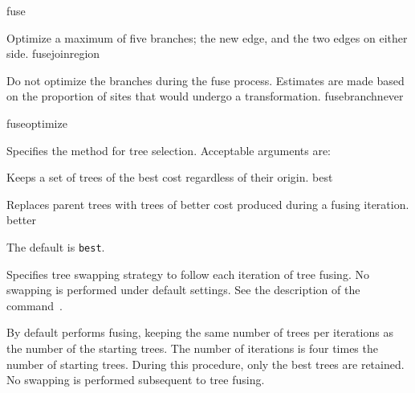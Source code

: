 \begin{command}{fuse}{}
\begin{arguments}
{\begin{description}
                    {Optimize a maximum of five branches; the new edge, and the two
                    edges on either side.}
                    {fusejoinregion}

                    {Do not optimize the branches during the fuse process.
                    Estimates are made based on the proportion of sites that
                    would undergo a transformation.}
                    {fusebranchnever}

            \end{description}
            }
            {fuseoptimize}

            {Specifies the method for tree selection. Acceptable arguments
            are:
            
            \begin{description}
                  {}
                 {Keeps a set of trees of the best cost regardless of their origin.}
                 {best}
                 
                  {}
                 {Replaces parent trees with trees of better cost
                produced during a fusing iteration.}
                {better}
                
              \end{description}
              
            The default is \texttt{best}.}
            {}

            {Specifies tree swapping strategy to follow each iteration of tree fusing.
            No swapping is performed under default settings.
            See the description of the command~.}
            {}
            
    \end{arguments}
    
        {By default \poy performs fusing, keeping the same number of trees per
        iterations as the number of the starting trees. The number of iterations is
        four times the number of starting trees. During this procedure, only the best
        trees are retained. No swapping is performed subsequent to tree fusing.}
        
    \begin{poyexamples}
	

\end{poyexamples}
\end{command}
